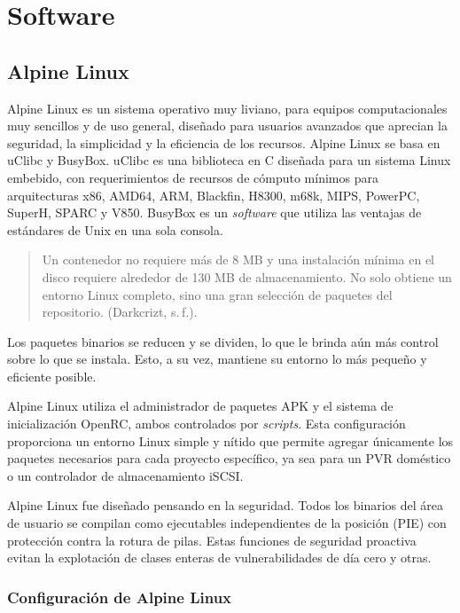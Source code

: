 \section{Software}

\subsection{Alpine Linux}
Alpine Linux es un sistema operativo muy liviano, para equipos computacionales muy sencillos y de uso general, diseñado para usuarios avanzados que aprecian la seguridad, la simplicidad y la eficiencia de los recursos. Alpine Linux se basa en uClibc y BusyBox. uClibc es una biblioteca en C diseñada para un sistema Linux embebido, con requerimientos de recursos de cómputo mínimos para arquitecturas x86, AMD64, ARM, Blackfin, H8300, m68k, MIPS, PowerPC, SuperH, SPARC y V850. BusyBox es un \emph{software} que utiliza las ventajas de estándares de Unix en una sola consola.

\begin{quote}\small
  Un contenedor no requiere más de 8 MB y una instalación mínima en el disco requiere alrededor de 130 MB de almacenamiento. No solo obtiene un entorno Linux completo, sino una gran selección de paquetes del repositorio. (Darkcrizt, s. f.).
\end{quote}

Los paquetes binarios se reducen y se dividen, lo que le brinda aún más control sobre lo que se instala. Esto, a su vez, mantiene su entorno lo más pequeño y eficiente posible.

Alpine Linux utiliza el administrador de paquetes APK y el sistema de inicialización OpenRC, ambos controlados por \emph{scripts}. Esta configuración proporciona un entorno Linux simple y nítido que permite agregar únicamente los paquetes necesarios para cada proyecto específico, ya sea para un PVR doméstico o un controlador de almacenamiento iSCSI.

Alpine Linux fue diseñado pensando en la seguridad. Todos los binarios del área de usuario se compilan como ejecutables independientes de la posición (PIE) con protección contra la rotura de pilas. Estas funciones de seguridad proactiva evitan la explotación de clases enteras de vulnerabilidades de día cero y otras.

\subsubsection{Configuración de Alpine Linux}


